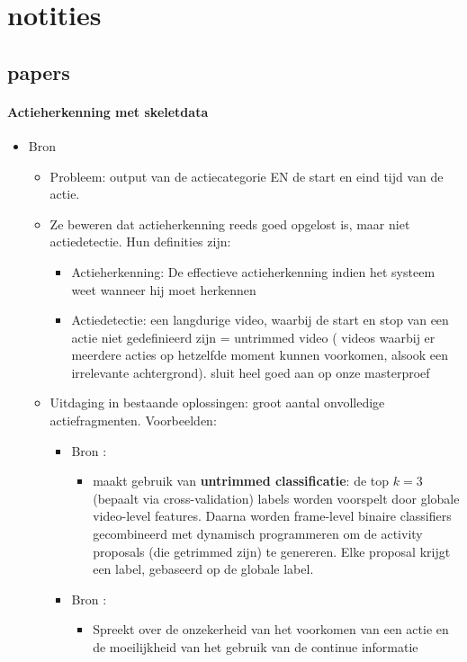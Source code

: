 \chapter{notities}

\section{papers}
\subsubsection{Actieherkenning met skeletdata}


\begin{itemize}



	\item Bron \cite{Zhao2017}
	\begin{itemize}
		\item Probleem: output van de actiecategorie EN de start en eind tijd van de actie. 
		\item Ze beweren dat actieherkenning reeds goed opgelost is, maar niet actiedetectie. Hun definities zijn: 
		\begin{itemize}
			\item Actieherkenning: De effectieve actieherkenning indien het systeem weet wanneer hij moet herkennen
			\item Actiedetectie: een langdurige video, waarbij de start en stop van een actie niet gedefinieerd zijn = untrimmed video ( videos waarbij er meerdere acties op hetzelfde moment kunnen voorkomen, alsook een irrelevante achtergrond). {\color{green} sluit heel goed aan op onze masterproef}
		\end{itemize}
		\item Uitdaging in bestaande oplossingen: groot aantal onvolledige actiefragmenten. Voorbeelden:
		\begin{itemize}
			\item Bron \cite{Singh2016}:
			\begin{itemize}
				\item maakt gebruik van \textbf{untrimmed classificatie}: de top $k = 3$ (bepaalt via cross-validation) labels worden voorspelt door globale video-level features. Daarna worden frame-level binaire classifiers gecombineerd met dynamisch programmeren om de activity proposals (die getrimmed zijn) te genereren. Elke proposal krijgt een label, gebaseerd op de globale label.
			\end{itemize}
				\item Bron \cite{Yuan2016}:
			\begin{itemize}
				\item Spreekt over de onzekerheid van het voorkomen van een actie en de moeilijkheid van het gebruik van de continue informatie


\end{itemize}
\end{itemize}
\end{itemize}
\end{itemize}
